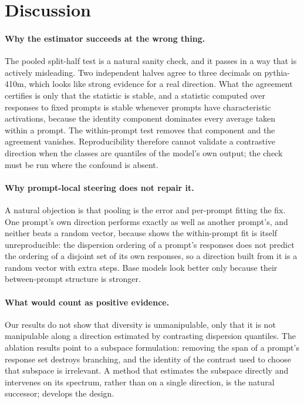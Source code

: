 \section{Discussion}
\label{sec:discussion}

\paragraph{Why the estimator succeeds at the wrong thing.}
The pooled split-half test is a natural sanity check, and it passes in a way that is actively
misleading. Two independent halves agree to three decimals on pythia-410m, which looks like strong
evidence for a real direction. What the agreement certifies is only that the statistic is stable,
and a statistic computed over responses to fixed prompts is stable whenever prompts have
characteristic activations, because the identity component dominates every average taken within a
prompt. The within-prompt test removes that component and the agreement vanishes. Reproducibility
therefore cannot validate a contrastive direction when the classes are quantiles of the model's own
output; the check must be run where the confound is absent.

\paragraph{Why prompt-local steering does not repair it.}
A natural objection is that pooling is the error and per-prompt fitting the fix. One prompt's own
direction performs exactly as well as another prompt's, and neither beats a random vector, because
 shows the within-prompt fit is itself unreproducible: the dispersion ordering of
a prompt's responses does not predict the ordering of a disjoint set of its own responses, so a
direction built from it is a random vector with extra steps. Base models look better only because
their between-prompt structure is stronger.

\paragraph{What would count as positive evidence.}
Our results do not show that diversity is unmanipulable, only that it is not manipulable along a
direction estimated by contrasting dispersion quantiles. The ablation results point to a subspace
formulation: removing the span of a prompt's response set destroys branching, and the identity of
the contrast used to choose that subspace is irrelevant. A method that estimates the subspace directly and intervenes on its spectrum, rather than on a
single direction, is the natural successor;  develops the design.

